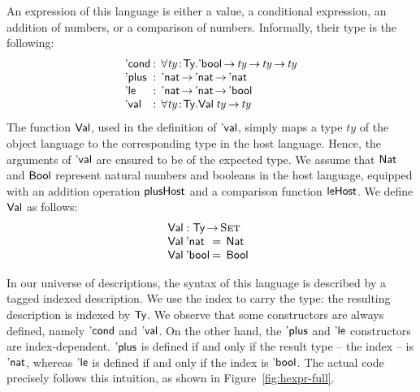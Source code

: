 An expression of this language is either a value, a conditional
expression, an addition of numbers, or a comparison of
numbers. Informally, their type is the following:
%
\[
\begin{array}{l@{\::\:\:}l}
\SYMBEcond           & \forall \Bhab{\V{ty}}{\Ty} . \Ebool \To \V{ty} \To \V{ty} \To \V{ty}  \\ 
\SYMBEplus           & \Enat \To \Enat \To \Enat                           \\
\SYMBEle             & \Enat \To \Enat \To \Ebool                          \\
\SYMBEval            & \forall \Bhab{\V{ty}}{\Ty} . \Val{\V{ty}} \To \V{ty}
\end{array}
\]
%
The function $\SYMBVal$, used in the definition of $\SYMBEval$, simply
maps a type $ty$ of the object language to the corresponding type in
the host language. Hence, the arguments of $\SYMBEval$ are ensured to
be of the expected type. We assume that $\Nat$ and $\Bool$ represent
natural numbers and booleans in the host language, equipped with an
addition operation $\F{plusHost}$ and a comparison function
$\F{leHost}$. We define $\SYMBVal$ as follows:
%
\[\stk{
\SYMBVal : \Ty \To \Set \\
\begin{array}{@{}l@{\:=\:\:}l}
\Val{\Enat}   & \Nat \\
\Val{\Ebool}  & \Bool
\end{array}
}\]

In our universe of descriptions, the syntax of this language is
described by a tagged indexed description. We use the index to carry
the type: the resulting description is indexed by $\Ty$. We observe
that some constructors are always defined, namely $\SYMBEcond$
and $\SYMBEval$. On the other hand, the $\SYMBEplus$ and
$\SYMBEle$ constructors are index-dependent. $\SYMBEplus$ is
defined if and only if the result type -- the index -- is $\Enat$,
whereas $\SYMBEle$ is defined if and only if the index is
$\Ebool$. The actual code precisely follows this intuition, as shown
in Figure~\ref{fig:hexpr-full}. 

